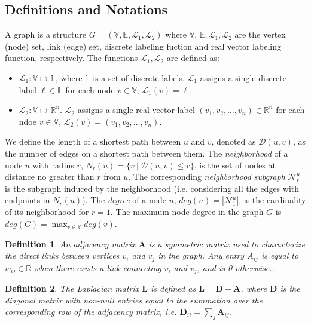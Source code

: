 \documentclass[review]{elsarticle}
\newtheorem{definition}{Definition}
\begin{document}
\subsection{Definitions and Notations}
A graph is a structure $G=(\mathbb{V},\mathbb{E}, \mathcal{L}_1, \mathcal{L}_2)$ where $\mathbb{V}$, $\mathbb{E}, \mathcal{L}_1, \mathcal{L}_2$ are the vertex (node) set, link (edge) set, discrete labeling fuction and real vector labeling function, respectively. The functions $\mathcal{L}_1, \mathcal{L}_2$ are defined as:
\begin{itemize}
\item $\mathcal{L}_1: \mathbb{V} \longmapsto \mathbb{L}$, where $\mathbb{L}$ is a set of discrete labels. $\mathcal{L}_1$ assigns a single discrete label $\ell \in \mathbb{L}$ for each node $v \in \mathbb{V}$, $\mathcal{L}_1(v) = \ell$. 
\item $\mathcal{L}_2: \mathbb{V} \longmapsto \mathbb{R}^n$. $\mathcal{L}_2$ assigns a single real vector label $(v_1,v_2,\ldots,v_n) \in \mathbb{R}^n$ for each ndoe $v \in \mathbb{V}$, $\mathcal{L}_2(v) = (v_1,v_2,\ldots,v_n)$.
\end{itemize}

We define the length of a shortest path between $u$ and $v$, denoted as $\mathcal{D}(u,v)$, as the number of edges on a shortest path between them. The \textit{neighborhood} of a node $u$ with radius $r$, $N_r(u) = \lbrace v\ |\ \mathcal{D}(u,v) \leq r \rbrace$, is the set of nodes at distance no greater than $r$ from $u$. The corresponding \textit{neighborhood subgraph} $\mathcal{N}_{r}^{u}$ is the  subgraph induced by the neighborhood (i.e. considering all the edges with endpoints in $N_r(u)$). The \textit{degree} of a node $u$, $deg(u) = |\mathcal{N}_{1}^{u}|$, is the cardinality of its neighborhood for $r=1$. The maximum node degree in the graph $G$ is $deg(G)=\max_{v\in \mathbb{V}}deg(v)$.

\begin{definition}{}
\textit{An adjacency matrix $\textbf{A}$ is a symmetric matrix used to characterize the direct links between vertices $v_{i}$ and $v_{j}$ in the graph. Any entry $A_{ij}$ is equal to $w_{ij}\in \mathbb{R}$ when there exists a link connecting $v_{i}$ and $v_{j}$, and is 0 otherwise.}. 
\end{definition}

\begin{definition}{}
\textit{The Laplacian matrix $\textbf{L}$ is defined as $\textbf{L} = \textbf{D}-\textbf{A}$, where $\textbf{D}$ is the diagonal matrix with non-null entries equal to the summation over the corresponding row of the adjacency matrix, i.e. $\textbf{D}_{ii}=\sum_j \textbf{A}_{ij}$.}
\end{definition}
\end{document}
